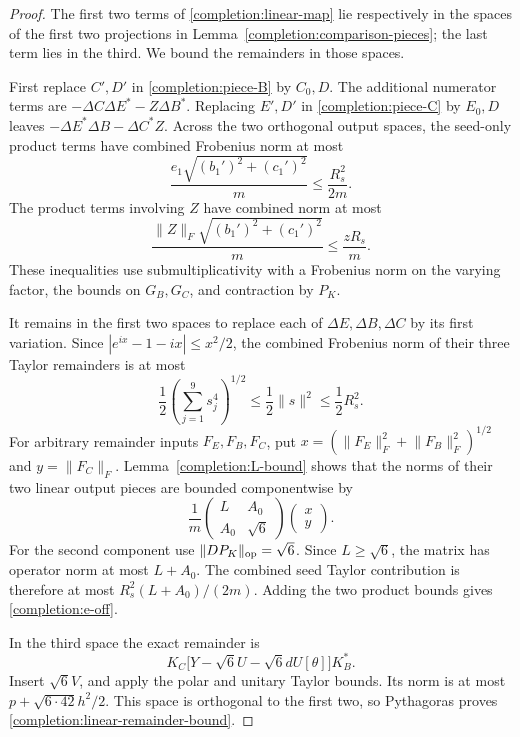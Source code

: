 \begin{proof}
The first two terms of \eqref{completion:linear-map} lie respectively in
the spaces of the first two projections in
Lemma~\ref{completion:comparison-pieces}; the last term lies in the third.
We bound the remainders in those spaces.

First replace $C',D'$ in \eqref{completion:piece-B} by $C_0,D$.
The additional numerator terms are
$-\Delta C\Delta E^*-Z\Delta B^*$.
Replacing $E',D'$ in \eqref{completion:piece-C} by $E_0,D$ leaves
$-\Delta E^*\Delta B-\Delta C^*Z$.
Across the two orthogonal output spaces, the seed-only product terms have
combined Frobenius norm at most
\[
 \frac{e_1\sqrt{(b_1')^2+(c_1')^2}}m
 \le\frac{R_s^2}{2m}.
\]
The product terms involving $Z$ have combined norm at most
\[
 \frac{\lVert Z\rVert_F\sqrt{(b_1')^2+(c_1')^2}}m
 \le\frac{zR_s}{m}.
\]
These inequalities use submultiplicativity with a Frobenius norm on the
varying factor, the bounds on $G_B,G_C$, and contraction by $P_K$.

It remains in the first two spaces to replace each of
$\Delta E,\Delta B,\Delta C$ by its first variation.
Since $|e^{ix}-1-ix|\le x^2/2$, the combined Frobenius norm of their three
Taylor remainders is at most
\[
 \frac12\left(\sum_{j=1}^9s_j^4\right)^{1/2}
 \le\frac12\lVert s\rVert^2\le\frac12R_s^2.
\]
For arbitrary remainder inputs $F_E,F_B,F_C$, put
$x=(\lVert F_E\rVert_F^2+\lVert F_B\rVert_F^2)^{1/2}$ and
$y=\lVert F_C\rVert_F$.  Lemma~\ref{completion:L-bound} shows that the
norms of their two linear output pieces are bounded componentwise by
\[
 \frac1m\begin{pmatrix}L&A_0\\ A_0&\sqrt6\end{pmatrix}
 \begin{pmatrix}x\\y\end{pmatrix}.
\]
For the second component use $\lVert DP_K\rVert_{\rm op}=\sqrt6$.
Since $L\ge\sqrt6$, the matrix has operator norm at most $L+A_0$.
The combined seed Taylor contribution is therefore at most
$R_s^2(L+A_0)/(2m)$.  Adding the two product bounds gives
\eqref{completion:e-off}.

In the third space the exact remainder is
\[
 K_C\big[Y-\sqrt6 U-\sqrt6 dU[\theta]\big]K_B^*.
\]
Insert $\sqrt6 V$, and apply the polar and unitary Taylor bounds.  Its
norm is at most $p+\sqrt{6\cdot42}h^2/2$.
This space is orthogonal to the first two, so Pythagoras proves
\eqref{completion:linear-remainder-bound}.
\end{proof}

